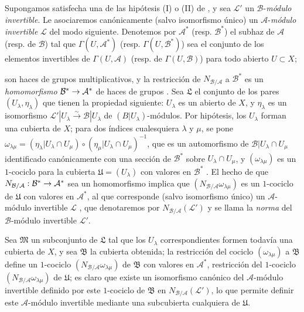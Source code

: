 \documentclass[oneside,10pt]{amsart}
\makeatletter
\newcommand{\ega@arrow}[2]{\mathchoice{#1}{#2}{#2}{#2}}
\renewcommand{\to}{\ega@arrow{\longrightarrow}{\rightarrow}}
\newcommand{\oldpage}[2][]{\marginnote{\normalfont\footnotesize\textbf{#1}~|~#2}\ignorespaces}
\let\EGAOriginalLabel\label
\renewcommand{\label}[1]{\phantomsection\EGAOriginalLabel{#1}}
\makeatother
\begin{document}
\begin{env}[6.5.2]
\label{II.6.5.2-fr}
Supongamos satisfecha una de las hipótesis (I) o (II) de , y sea $\mathcal{L}'$ un $\mathcal{B}$-\emph{módulo invertible}.
Le asociaremos canónicamente (salvo isomorfismo único) un $\mathcal{A}$-\emph{módulo invertible} $\mathcal{L}$ del modo siguiente.
Denotemos por $\mathcal{A}^*$ (resp. $\mathcal{B}^*$) el subhaz de $\mathcal{A}$ (resp. de $\mathcal{B}$) tal que $\Gamma(U,\mathcal{A}^*)$ (resp. $\Gamma(U,\mathcal{B}^*)$) sea el conjunto de los 
\oldpage[II]{127}
elementos invertibles de $\Gamma(U,\mathcal{A})$ (resp. de $\Gamma(U,\mathcal{B})$) para todo abierto $U\subset X$;

son haces de grupos multiplicativos, y la restricción de $N_{\mathcal{B}/\mathcal{A}}$ a $\mathcal{B}^*$ es un \emph{homomorfismo} $\mathcal{B}^*\to\mathcal{A}^*$ de haces de grupos .
Sea $\mathfrak{L}$ el conjunto de los pares $(U_\lambda,\eta_\lambda)$ que tienen la propiedad siguiente: $U_\lambda$ es un abierto de $X$, y $\eta_\lambda$ es un isomorfismo $\mathcal{L}'|U_\lambda\xrightarrow{\sim}\mathcal{B}|U_\lambda$ de $(B|U_\lambda)$-módulos.
Por hipótesis, los $U_\lambda$ forman una cubierta de $X$;
para dos índices cualesquiera $\lambda$ y $\mu$, se pone $\omega_{\lambda\mu}=(\eta_\lambda|U_\lambda\cap U_\mu)
\circ(\eta_\mu|U_\lambda\cap U_\mu)^{-1}$, que es un automorfismo de $\mathcal{B}|U_\lambda\cap U_\mu$ identificado canónicamente con una sección de $\mathcal{B}^*$ sobre $U_\lambda\cap U_\mu$, y $(\omega_{\lambda\mu})$ es un $1$-cociclo para la cubierta $\mathfrak{U}=(U_\lambda)$ con valores en $\mathcal{B}^*$ .
El hecho de que $N_{\mathcal{B}/\mathcal{A}}:\mathcal{B}^*\to\mathcal{A}^*$ sea un homomorfismo implica que $(N_{\mathcal{B}/\mathcal{A}}\omega_{\lambda\mu})$ es un $1$-cociclo de $\mathfrak{U}$ con valores en $\mathcal{A}^*$, al que corresponde (salvo isomorfismo único) un $\mathcal{A}$-módulo invertible $\mathcal{L}$ , que denotaremos por $N_{\mathcal{B}/\mathcal{A}}(\mathcal{L}')$ y se llama la \emph{norma} del $\mathcal{B}$-módulo invertible $\mathcal{L}'$.

Sea $\mathfrak{M}$ un subconjunto de $\mathfrak{L}$ tal que los $U_\lambda$ correspondientes formen todavía una cubierta de $X$, y sea $\mathfrak{B}$ la cubierta obtenida;
la restricción del cociclo $(\omega_{\lambda\mu})$ a $\mathfrak{B}$ define un $1$-cociclo $(N_{\mathcal{B}/\mathcal{A}}\omega_{\lambda\mu})$ de $\mathfrak{B}$ con valores en $\mathcal{A}^*$, restricción del $1$-cociclo $(N_{\mathcal{B}/\mathcal{A}}\omega_{\lambda\mu})$ de $\mathfrak{U}$;
es claro que existe un isomorfismo canónico del $\mathcal{A}$-módulo invertible definido por este $1$-cociclo de $\mathfrak{B}$ en $N_{\mathcal{B}/\mathcal{A}}(\mathcal{L}')$, lo que permite definir este $\mathcal{A}$-módulo invertible mediante una subcubierta cualquiera de $\mathfrak{U}$.


\end{env}
\end{document}

